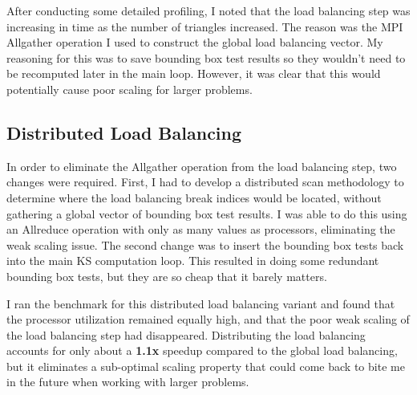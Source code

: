 \documentclass[11pt,letterpaper]{article}
\begin{document}
After conducting some detailed profiling, I noted that the load balancing step was increasing in time as the number of triangles increased.
The reason was the MPI Allgather operation I used to construct the global load balancing vector.
My reasoning for this was to save bounding box test results so they wouldn't need to be recomputed later in the main loop.
However, it was clear that this would potentially cause poor scaling for larger problems.

\subsection{Distributed Load Balancing}
In order to eliminate the Allgather operation from the load balancing step, two changes were required.
First, I had to develop a distributed scan methodology to determine where the load balancing break indices would be located, without gathering a global vector of bounding box test results.
I was able to do this using an Allreduce operation with only as many values as processors, eliminating the weak scaling issue.
The second change was to insert the bounding box tests back into the main KS computation loop.
This resulted in doing some redundant bounding box tests, but they are so cheap that it barely matters.

I ran the benchmark for this distributed load balancing variant and found that the processor utilization remained equally high, and that the poor weak scaling of the load balancing step had disappeared.
Distributing the load balancing accounts for only about a \textbf{1.1x} speedup compared to the global load balancing, but it eliminates a sub-optimal scaling property that could come back to bite me in the future when working with larger problems.
\end{document}
